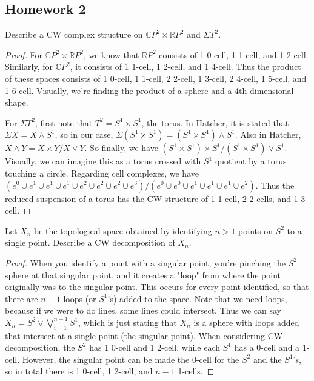\documentclass[12pt]{article}
\newenvironment{statement}[2][Statement]{\begin{trivlist}
\item[\hskip \labelsep {\bfseries #1}\hskip \labelsep {\bfseries #2.}]}{\end{trivlist}}
\begin{document}
\subsection{Homework 2}

\begin{statement}[Exercise]{1}
    Describe a CW complex structure on $\mathbb{C}P^2 \times \mathbb{R}P^2$ and $\Sigma T^2$.
\end{statement}
\begin{proof}
    For $\mathbb{C}P^2 \times \mathbb{R}P^2$, we know that $\mathbb{R}P^2$ consists of 1 0-cell, 1 1-cell, and 1 2-cell. Similarly, for $\mathbb{C}P^2$, it consists of 1 1-cell, 1 2-cell, and 1 4-cell. Thus the product of these spaces consists of 1 0-cell, 1 1-cell, 2 2-cell, 1 3-cell, 2 4-cell, 1 5-cell, and 1 6-cell. Visually, we're finding the product of a sphere and a 4th dimensional shape.
    \par For $\Sigma T^2$, first note that $T^2 = S^1 \times S^1$, the torus. In Hatcher, it is stated that $\Sigma X = X \wedge S^1$, so in our case, $\Sigma (S^1 \times S^1) = (S^1 \times S^1) \wedge S^1$. Also in Hatcher, $ X \wedge Y = X \times Y / X \vee Y$. So finally, we have $ (S^1 \times S^1) \times S^1 / (S^1 \times S^1) \vee S^1$. Visually, we can imagine this as a torus crossed with $S^1$ quotient by a torus touching a circle. Regarding cell complexes, we have $(e^0 \cup e^1 \cup e^1 \cup e^1 \cup e^2 \cup e^2 \cup e^2 \cup e^3) / (e^0 \cup e^0 \cup e^1 \cup e^1 \cup e^1 \cup e^2)$. Thus the reduced suspension of a torus has the CW structure of 1 1-cell, 2 2-cells, and 1 3-cell.
\end{proof}

\begin{statement}[Exercise]{2}
    Let $X_n$ be the topological space obtained by identifying $n > 1$ points on $S^2$ to a single point. Describe a CW decomposition of $X_n$.
\end{statement}
\begin{proof}
    When you identify a point with a singular point, you're pinching the $S^2$ sphere at that singular point, and it creates a "loop" from where the point originally was to the singular point. This occurs for every point identified, so that there are $n-1$ loops (or $S^1$'s) added to the space. Note that we need loops, because if we were to do lines, some lines could intersect. Thus we can say $X_n = S^2 \vee \bigvee_{i=1}^{n-1} S^1$, which is just stating that $X_n$ is a sphere with loops added that intersect at a single point (the singular point). When considering CW decomposition, the $S^2$ has 1 0-cell and 1 2-cell, while each $S^1$ has a 0-cell and a 1-cell. However, the singular point can be made the 0-cell for the $S^2$ and the $S^1$'s, so in total there is 1 0-cell, 1 2-cell, and $n-1$ 1-cells. 
\end{proof}
\end{document}
